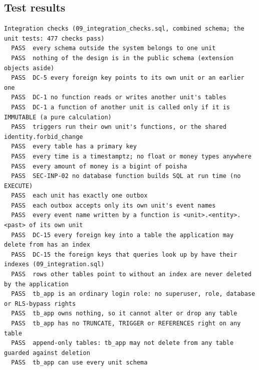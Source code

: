 \documentclass[11pt,a4paper]{article}
\begin{document}
\subsection{Test results}
\label{app:tests}
{\scriptsize
\begin{verbatim}
Integration checks (09_integration_checks.sql, combined schema; the unit tests: 477 checks pass)
  PASS  every schema outside the system belongs to one unit
  PASS  nothing of the design is in the public schema (extension objects aside)
  PASS  DC-5 every foreign key points to its own unit or an earlier one
  PASS  DC-1 no function reads or writes another unit's tables
  PASS  DC-1 a function of another unit is called only if it is IMMUTABLE (a pure calculation)
  PASS  triggers run their own unit's functions, or the shared identity.forbid_change
  PASS  every table has a primary key
  PASS  every time is a timestamptz; no float or money types anywhere
  PASS  every amount of money is a bigint of poisha
  PASS  SEC-INP-02 no database function builds SQL at run time (no EXECUTE)
  PASS  each unit has exactly one outbox
  PASS  each outbox accepts only its own unit's event names
  PASS  every event name written by a function is <unit>.<entity>.<past> of its own unit
  PASS  DC-15 every foreign key into a table the application may delete from has an index
  PASS  DC-15 the foreign keys that queries look up by have their indexes (09_integration.sql)
  PASS  rows other tables point to without an index are never deleted by the application
  PASS  tb_app is an ordinary login role: no superuser, role, database or RLS-bypass rights
  PASS  tb_app owns nothing, so it cannot alter or drop any table
  PASS  tb_app has no TRUNCATE, TRIGGER or REFERENCES right on any table
  PASS  append-only tables: tb_app may not delete from any table guarded against deletion
  PASS  tb_app can use every unit schema


\end{verbatim}}
\end{document}
